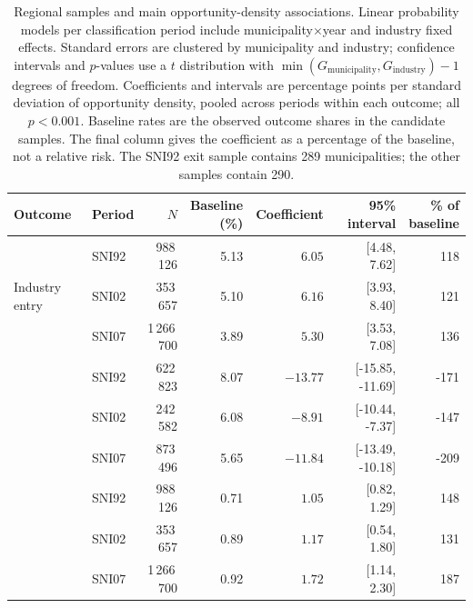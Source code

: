 \documentclass[9pt,twoside]{pnas-new}
\begin{document}
\begin{table}[H]
\centering
\small
\setlength{\tabcolsep}{4pt}
\caption{Regional samples and main opportunity-density associations. Linear probability models per classification period include municipality$\times$year and industry fixed effects. Standard errors are clustered by municipality and industry; confidence intervals and $p$-values use a $t$ distribution with $\min(G_{\mathrm{municipality}},G_{\mathrm{industry}})-1$ degrees of freedom. Coefficients and intervals are percentage points per standard deviation of opportunity density, pooled across periods within each outcome; all $p<0.001$. Baseline rates are the observed outcome shares in the candidate samples. The final column gives the coefficient as a percentage of the baseline, not a relative risk. The SNI92 exit sample contains 289 municipalities; the other samples contain 290.}
\label{tab:regional-samples}
\label{tab:regional_results}
\begin{tabular}{llrrrrr}
\toprule
Outcome & Period & $N$ & \shortstack{Baseline\\(\%)} & Coefficient & 95\% interval & \shortstack{\% of\\baseline} \\
\midrule
\multirow{3}{*}{Industry entry} & SNI92 & 988\,126 & 5.13 & $6.05$ & [4.48, 7.62] & 118 \\
 & SNI02 & 353\,657 & 5.10 & $6.16$ & [3.93, 8.40] & 121 \\
 & SNI07 & 1\,266\,700 & 3.89 & $5.30$ & [3.53, 7.08] & 136 \\
\addlinespace
\multirow{3}{*}{Industry exit} & SNI92 & 622\,823 & 8.07 & $-13.77$ & [-15.85, -11.69] & -171 \\
 & SNI02 & 242\,582 & 6.08 & $-8.91$ & [-10.44, -7.37] & -147 \\
 & SNI07 & 873\,496 & 5.65 & $-11.84$ & [-13.49, -10.18] & -209 \\
\addlinespace
\multirow{3}{*}{Startup formation} & SNI92 & 988\,126 & 0.71 & $1.05$ & [0.82, 1.29] & 148 \\
 & SNI02 & 353\,657 & 0.89 & $1.17$ & [0.54, 1.80] & 131 \\
 & SNI07 & 1\,266\,700 & 0.92 & $1.72$ & [1.14, 2.30] & 187 \\
\bottomrule
\end{tabular}
\end{table}
\end{document}
